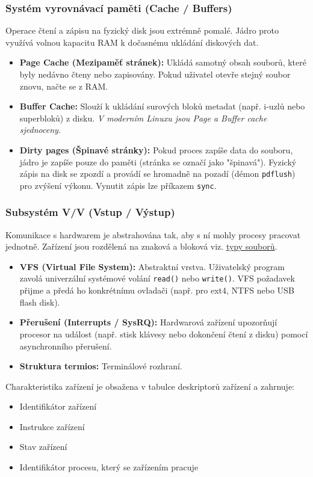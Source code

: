 \subsubsection*{Systém vyrovnávací paměti (Cache / Buffers)}
Operace čtení a zápisu na fyzický disk jsou extrémně pomalé. Jádro proto využívá volnou kapacitu RAM k dočasnému ukládání diskových dat.
\begin{itemize}
    \item \textbf{Page Cache (Mezipaměť stránek):} Ukládá samotný obsah souborů, které byly nedávno čteny nebo zapisovány. Pokud uživatel otevře stejný soubor znovu, načte se z RAM.
    \item \textbf{Buffer Cache:} Slouží k ukládání surových bloků metadat (např. i-uzlů nebo superbloků) z disku. \textit{V moderním Linuxu jsou Page a Buffer cache sjednoceny.}
    \item \textbf{Dirty pages (Špinavé stránky):} Pokud proces zapíše data do souboru, jádro je zapíše pouze do paměti (stránka se označí jako "špinavá"). Fyzický zápis na disk se zpozdí a provádí se hromadně na pozadí (démon \texttt{pdflush}) pro zvýšení výkonu. Vynutit zápis lze příkazem \texttt{sync}.
\end{itemize}

\subsubsection*{Subsystém V/V (Vstup / Výstup)}
\label{prg:vv}
Komunikace s hardwarem je abstrahována tak, aby s ní mohly procesy pracovat jednotně.
Zařízení jsou rozdělená na znaková a bloková viz. \hyperref[prg:typysoub]{typy souborů}.

\begin{itemize}
    \item \textbf{VFS (Virtual File System):} Abstraktní vrstva. Uživatelský program zavolá univerzální systémové volání \texttt{read()} nebo \texttt{write()}. VFS požadavek přijme a předá ho konkrétnímu ovladači (např. pro ext4, NTFS nebo USB flash disk).
    \item \textbf{Přerušení (Interrupts / SysRQ):} Hardwarová zařízení upozorňují procesor na událost (např. stisk klávesy nebo dokončení čtení z disku) pomocí asynchronního přerušení.
    \item \textbf{Struktura termios:} Terminálové rozhraní.
\end{itemize}
Charakteristika zařízení je obsažena v
tabulce deskriptorů zařízení a
zahrnuje:
\begin{itemize}
    \item Identifikátor zařízení
    \item Instrukce zařízení
    \item Stav zařízení
    \item Identifikátor procesu, který se zařízením pracuje
\end{itemize}

